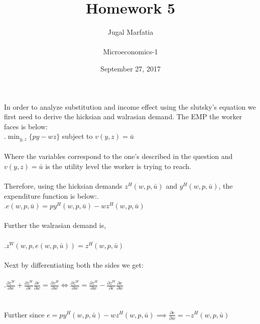 \documentclass[12pt]{article}
\title{Homework 5}
\author{Jugal Marfatia \\ \\Microeconomics-1 \\ }
\date{September 27, 2017}
\newenvironment{problem}[2][Problem]{\begin{trivlist}
\item[\hskip \labelsep {\bfseries #1}\hskip \labelsep {\bfseries #2.}]}{\end{trivlist}}
\newcommand\ddfrac[2]{\frac{\displaystyle #1}{\displaystyle #2}}
\begin{document}
\maketitle

\begin{problem}{1}
In order to analyze substitution and income effect using the slutsky's equation we first need to derive the hicksian and walrasian demand. The EMP the worker faces is below:
\\
.\hspace{40mm}$\displaystyle \min_{y, z} \{py - wz\} $ subject to $ v(y, z) = \bar{u} $
\\
\\
Where the variables correspond to the one's described in the question and $v(y, z) = \bar{u} $ is the utility level the worker is trying to reach. 
\\
\\
Therefore, using the hicksian demands $z^H(w, p, \bar{u})  $ and $y^H(w, p, \bar{u})  $, the expenditure function is below:. 
\\
.\hspace{40mm}$\displaystyle e(w, p, \bar{u}) =  p y^H(w, p, \bar{u}) - w z^H(w, p, \bar{u}) $
\\
\\
Further the walrasian demand is,
\\
\\
.\hspace{40mm}$\displaystyle z^W(w, p, e(w, p, \bar{u})) = z^H(w, p, \bar{u})  $
\\
\\
Next by differentiating both the sides we get:
\\
\\
.\hspace{30mm}$\ddfrac{\partial z^W}{\partial w} +  \ddfrac{\partial z^W}{\partial e} \ddfrac{\partial e}{\partial w} = \ddfrac{\partial z^H}{\partial w} \iff \ddfrac{\partial z^W}{\partial w} =  \ddfrac{\partial z^H}{\partial w} - \ddfrac{\partial z^W}{\partial e} \ddfrac{\partial e}{\partial w} $
\\
\\
\\
Further since $e =  p y^H(w, p, \bar{u}) - w z^H(w, p, \bar{u}) \implies \ddfrac{\partial e}{\partial w} = - z^H(w, p, \bar{u})$
\\
\\
\\

\end{problem}
\end{document}
